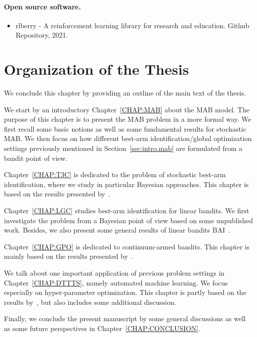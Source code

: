\paragraph{Open source software.}

\begin{itemize}[label=]
    \item rlberry - A reinforcement learning library for research and education. Github Repository, 2021.~\citep{rlberry2021}
\end{itemize}

\section{Organization of the Thesis}\label{sec:intro.organization}

We conclude this chapter by providing an outline of the main text of the thesis. 

We start by an introductory Chapter~\ref{CHAP:MAB} about the MAB model. The purpose of this chapter is to present the MAB problem in a more formal way. We first recall some basic notions as well as some fundamental results for stochastic MAB. We then focus on how different best-arm identification/global optimization settings previously mentioned in Section~\ref{sec:intro.mab} are formulated from a bandit point of view.

Chapter~\ref{CHAP:T3C} is dedicated to the problem of stochastic best-arm identification, where we study in particular Bayesian approaches. This chapter is based on the results presented by~\cite{shang2020t3c}.

Chapter~\ref{CHAP:LGC} studies best-arm identification for linear bandits. We first investigate the problem from a Bayesian point of view based on some unpublished work. Besides, we also present some general results of linear bandits BAI~\citep{degenne2020game}. 

Chapter~\ref{CHAP:GPO} is dedicated to continuum-armed bandits. This chapter is mainly based on the results presented by~\cite{shang2019adaptive}.

We talk about one important application of previous problem settings in Chapter~\ref{CHAP:DTTTS}, namely \gls{automated machine learning}. We focus especially on hyper-parameter optimization. This chapter is partly based on the results by~\cite{shang2019dttts,shang2020dttts}, but also includes some additional discussion.

Finally, we conclude the present manuscript by some general discussions as well as some future perspectives in Chapter~\ref{CHAP:CONCLUSION}.

% 
% 
